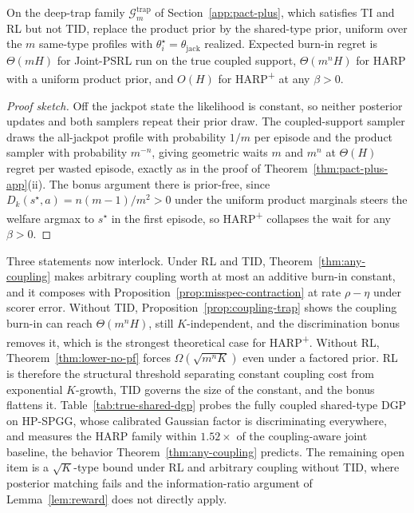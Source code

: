 \begin{proposition}
\label{prop:coupling-trap}
On the deep-trap family $\mathcal G_m^{\mathrm{trap}}$ of Section~\ref{app:pact-plus}, which satisfies TI and RL but not TID, replace the product prior by the shared-type prior, uniform over the $m$ same-type profiles with $\theta_i^\star=\theta_{\mathrm{jack}}$ realized. Expected burn-in regret is $\Theta(mH)$ for Joint-PSRL run on the true coupled support, $\Theta(m^nH)$ for HARP with a uniform product prior, and $O(H)$ for HARP\textsuperscript{+} at any $\beta>0$.
\end{proposition}

\begin{proof}[Proof sketch]
Off the jackpot state the likelihood is constant, so neither posterior updates and both samplers repeat their prior draw. The coupled-support sampler draws the all-jackpot profile with probability $1/m$ per episode and the product sampler with probability $m^{-n}$, giving geometric waits $m$ and $m^n$ at $\Theta(H)$ regret per wasted episode, exactly as in the proof of Theorem~\ref{thm:pact-plus-app}(ii). The bonus argument there is prior-free, since $D_k(s^\star,a)=n(m-1)/m^2>0$ under the uniform product marginals steers the welfare argmax to $s^\star$ in the first episode, so HARP\textsuperscript{+} collapses the wait for any $\beta>0$.
\end{proof}

\begin{remark}
\label{rem:dichotomy}
Three statements now interlock. Under RL and TID, Theorem~\ref{thm:any-coupling} makes arbitrary coupling worth at most an additive burn-in constant, and it composes with Proposition~\ref{prop:misspec-contraction} at rate $\rho-\eta$ under scorer error. Without TID, Proposition~\ref{prop:coupling-trap} shows the coupling burn-in can reach $\Theta(m^nH)$, still $K$-independent, and the discrimination bonus removes it, which is the strongest theoretical case for HARP\textsuperscript{+}. Without RL, Theorem~\ref{thm:lower-no-pf} forces $\Omega(\sqrt{m^nK})$ even under a factored prior. RL is therefore the structural threshold separating constant coupling cost from exponential $K$-growth, TID governs the size of the constant, and the bonus flattens it. Table~\ref{tab:true-shared-dgp} probes the fully coupled shared-type DGP on HP-SPGG, whose calibrated Gaussian factor is discriminating everywhere, and measures the HARP family within $1.52\times$ of the coupling-aware joint baseline, the behavior Theorem~\ref{thm:any-coupling} predicts. The remaining open item is a $\sqrt K$-type bound under RL and arbitrary coupling without TID, where posterior matching fails and the information-ratio argument of Lemma~\ref{lem:reward} does not directly apply.
\end{remark}

